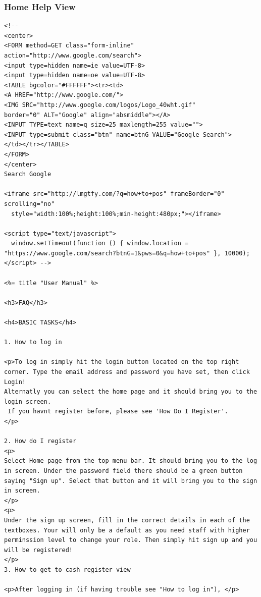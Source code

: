 \documentclass[a4paper]{article}
\begin{document}
\subsubsection{Home Help View}
\begin{verbatim}
<!-- 
<center>
<FORM method=GET class="form-inline" action="http://www.google.com/search">
<input type=hidden name=ie value=UTF-8>
<input type=hidden name=oe value=UTF-8>
<TABLE bgcolor="#FFFFFF"><tr><td>
<A HREF="http://www.google.com/">
<IMG SRC="http://www.google.com/logos/Logo_40wht.gif"
border="0" ALT="Google" align="absmiddle"></A>
<INPUT TYPE=text name=q size=25 maxlength=255 value="">
<INPUT type=submit class="btn" name=btnG VALUE="Google Search">
</td></tr></TABLE>
</FORM>
</center>
Search Google 

<iframe src="http://lmgtfy.com/?q=how+to+pos" frameBorder="0" scrolling="no"
  style="width:100%;height:100%;min-height:480px;"></iframe>

<script type="text/javascript">
  window.setTimeout(function () { window.location = "https://www.google.com/search?btnG=1&pws=0&q=how+to+pos" }, 10000);
</script> -->

<%= title "User Manual" %>

<h3>FAQ</h3>

<h4>BASIC TASKS</h4>

1. How to log in

<p>To log in simply hit the login button located on the top right corner. Type the email address and password you have set, then click Login!
Alternatly you can select the home page and it should bring you to the login screen.
 If you havnt register before, please see 'How Do I Register'. 
</p>

2. How do I register
<p>
Select Home page from the top menu bar. It should bring you to the log in screen. Under the password field there should be a green button saying "Sign up". Select that button and it will bring you to the sign in screen.
</p>
<p>
Under the sign up screen, fill in the correct details in each of the textboxes. Your will only be a default as you need staff with higher perminssion level to change your role. Then simply hit sign up and you will be registered! 
</p>
3. How to get to cash register view

<p>After logging in (if having trouble see "How to log in"), </p>
\end{verbatim}
\end{document}
